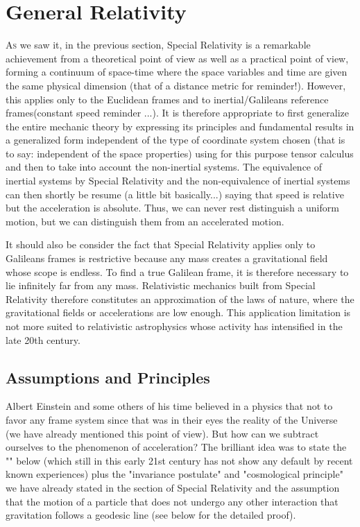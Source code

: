 	\section{General Relativity}
	\lettrine[lines=4]{\color{BrickRed}A}s we saw it, in the previous section, Special Relativity is a remarkable achievement from a theoretical point of view as well as a practical point of view, forming a continuum of space-time where the space variables and time are given the same physical dimension (that of a distance metric for reminder!). However, this applies only to the Euclidean frames and to inertial/Galileans reference frames(constant speed reminder ...). It is therefore appropriate to first generalize the entire mechanic theory by expressing its principles and fundamental results in a generalized form independent of the type of coordinate system chosen (that is to say: independent of the space properties) using for this purpose tensor calculus and then to take into account the non-inertial systems. The equivalence of inertial systems by Special Relativity and the non-equivalence of inertial systems can then shortly be resume (a little bit basically...) saying that speed is relative but the acceleration is absolute. Thus, we can never rest distinguish a uniform motion, but we can distinguish them from an accelerated motion.
	
	It should also be consider the fact that Special Relativity applies only to Galileans frames is restrictive because any mass creates a gravitational field whose scope is endless. To find a true Galilean frame, it is therefore necessary to lie infinitely far from any mass. Relativistic mechanics built from Special Relativity therefore constitutes an approximation of the laws of nature, where the gravitational fields or accelerations are low enough. This application limitation is not  more suited to relativistic astrophysics whose activity has intensified in the late 20th century.
	
	\subsection{Assumptions and Principles}
	Albert Einstein and some others of his time believed in a physics that not to favor any frame system since that was in their eyes the reality of the Universe (we have already mentioned this point of view). But how can we subtract ourselves to the phenomenon of  acceleration? The brilliant idea was to state the "" below (which still in this early 21st century has not show any default by recent known experiences) plus the "invariance postulate" and "cosmological principle" we have already stated in the section of Special Relativity and the assumption that the motion of a particle that does not undergo any other interaction that gravitation follows a geodesic line (see below for the detailed proof).
	
